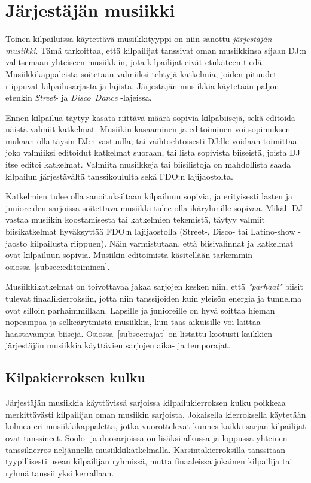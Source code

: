 \documentclass[12pt, a4paper, oneside]{article}
\begin{document}
\section{Järjestäjän musiikki} \label{sec:dj-musiikki}

Toinen kilpailuissa käytettävä musiikkityyppi on niin sanottu \textit{järjestäjän musiikki}.
Tämä tarkoittaa,
että kilpailijat tanssivat oman musiikkinsa sijaan DJ:n valitsemaan yhteiseen musiikkiin,
jota kilpailijat eivät etukäteen tiedä.
Musiikkikappaleista soitetaan valmiiksi tehtyjä katkelmia,
joiden pituudet riippuvat kilpailusarjasta ja lajista.
Järjestäjän musiikkia käytetään paljon etenkin \textit{Street}- ja \textit{Disco~Dance} -lajeissa.

Ennen kilpailua täytyy kasata riittävä määrä sopivia kilpabiisejä,
sekä editoida näistä valmiit katkelmat.
Musiikin kasaaminen ja editoiminen voi sopimuksen mukaan olla täysin DJ:n vastuulla,
tai vaihtoehtoisesti DJ:lle voidaan toimittaa joko valmiiksi editoidut katkelmat suoraan,
tai lista sopivista biiseistä,
joista DJ itse editoi katkelmat.
Valmiita musiikkeja tai biisilistoja on mahdollista saada kilpailun järjestävältä tanssikoululta sekä FDO:n lajijaostolta.

Katkelmien tulee olla sanoituksiltaan kilpailuun sopivia,
ja erityisesti lasten ja junioreiden sarjoissa soitettava musiikki tulee olla ikäryhmille sopivaa.
Mikäli DJ vastaa musiikin koostamisesta tai katkelmien tekemistä,
täytyy valmiit biisikatkelmat hyväksyttää FDO:n lajijaostolla (Street-, Disco- tai Latino-show -jaosto kilpailusta riippuen).
Näin varmistutaan,
että biisivalinnat ja katkelmat ovat kilpailuun sopivia.
Musiikin editoimista käsitellään tarkemmin osiossa~\ref{subsec:editoiminen}.

Musiikkikatkelmat on toivottavaa jakaa sarjojen kesken niin,
että \textit{"parhaat"} biisit tulevat finaalikierroksiin,
jotta niin tanssijoiden kuin yleisön energia ja tunnelma ovat silloin parhaimmillaan.
Lapsille ja junioreille on hyvä soittaa hieman nopeampaa ja selkeärytmistä musiikkia,
kun taas aikuisille voi laittaa haastavampia biisejä.
Osiossa~\ref{subsec:rajat} on listattu kootusti kaikkien järjestäjän musiikkia käyttävien sarjojen aika- ja temporajat.

\subsection{Kilpakierroksen kulku} \label{subsec:kilpakierroksen-kulku2}

Järjestäjän musiikkia käyttävissä sarjoissa kilpailukierroksen kulku poikkeaa merkittävästi kilpailijan oman musiikin sarjoista.
Jokaisella kierroksella käytetään kolmea eri musiikkikappaletta,
jotka vuorottelevat kunnes kaikki sarjan kilpailijat ovat tanssineet.
Soolo- ja duosarjoissa on lisäksi alkussa ja loppussa yhteinen tanssikierros neljännellä musiikkikatkelmalla.
Karsintakierroksilla tanssitaan tyypillisesti usean kilpailijan ryhmissä,
mutta finaaleissa jokainen kilpailija tai ryhmä tanssii yksi kerrallaan.
\end{document}
